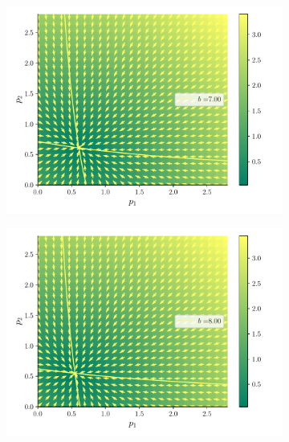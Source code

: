 \documentclass[twocolumn,aps,prl]{revtex4-1}
\begin{document}
\begin{figure}[ht!]
\begin{subfigure}[b]{0.49\linewidth}
      \includegraphics[width = 0.999\textwidth]{figuras/ex02-cosa3-6.pdf}
  \end{subfigure}\quad
  \begin{subfigure}[b]{0.49\linewidth}
      \centering
      \includegraphics[width = 0.999\textwidth]{figuras/ex02-cosa3-7.pdf}
  \end{subfigure}\quad
  \caption{}
  \label{fig:figuras/ex02-cosa3}
\end{figure}
\end{document}

